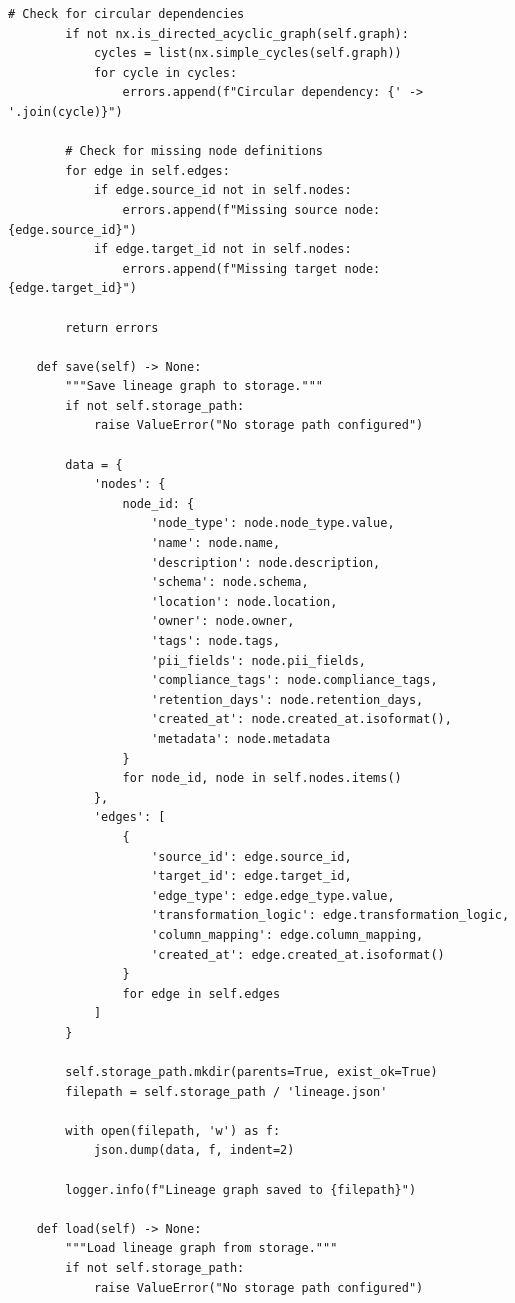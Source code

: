 \begin{lstlisting}[style=python, caption={Automated data lineage tracking system}]
        # Check for circular dependencies
        if not nx.is_directed_acyclic_graph(self.graph):
            cycles = list(nx.simple_cycles(self.graph))
            for cycle in cycles:
                errors.append(f"Circular dependency: {' -> '.join(cycle)}")

        # Check for missing node definitions
        for edge in self.edges:
            if edge.source_id not in self.nodes:
                errors.append(f"Missing source node: {edge.source_id}")
            if edge.target_id not in self.nodes:
                errors.append(f"Missing target node: {edge.target_id}")

        return errors

    def save(self) -> None:
        """Save lineage graph to storage."""
        if not self.storage_path:
            raise ValueError("No storage path configured")

        data = {
            'nodes': {
                node_id: {
                    'node_type': node.node_type.value,
                    'name': node.name,
                    'description': node.description,
                    'schema': node.schema,
                    'location': node.location,
                    'owner': node.owner,
                    'tags': node.tags,
                    'pii_fields': node.pii_fields,
                    'compliance_tags': node.compliance_tags,
                    'retention_days': node.retention_days,
                    'created_at': node.created_at.isoformat(),
                    'metadata': node.metadata
                }
                for node_id, node in self.nodes.items()
            },
            'edges': [
                {
                    'source_id': edge.source_id,
                    'target_id': edge.target_id,
                    'edge_type': edge.edge_type.value,
                    'transformation_logic': edge.transformation_logic,
                    'column_mapping': edge.column_mapping,
                    'created_at': edge.created_at.isoformat()
                }
                for edge in self.edges
            ]
        }

        self.storage_path.mkdir(parents=True, exist_ok=True)
        filepath = self.storage_path / 'lineage.json'

        with open(filepath, 'w') as f:
            json.dump(data, f, indent=2)

        logger.info(f"Lineage graph saved to {filepath}")

    def load(self) -> None:
        """Load lineage graph from storage."""
        if not self.storage_path:
            raise ValueError("No storage path configured")


\end{lstlisting}
